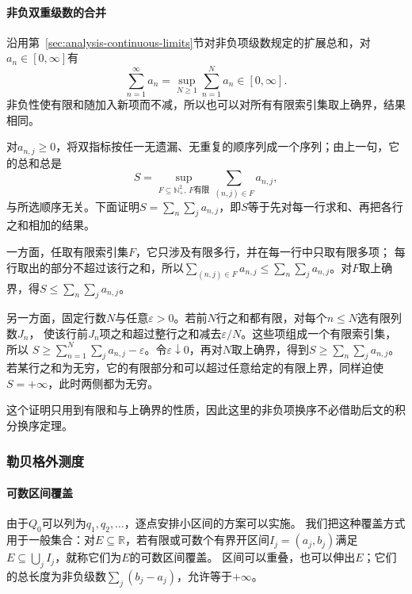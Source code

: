 \paragraph{非负双重级数的合并}

沿用第~\ref{sec:analysis-continuous-limits}节对非负项级数规定的扩展总和，对$a_n\in[0,\infty]$有
\begin{equation}
 \sum_{n=1}^{\infty}a_n
 =\sup_{N\geq1}\sum_{n=1}^Na_n\in[0,\infty].
 \label{eq:comb-nonnegative-sum-supremum}
\end{equation}
非负性使有限和随加入新项而不减，所以也可以对所有有限索引集取上确界，结果相同。

对$a_{n,j}\geq0$，将双指标按任一无遗漏、无重复的顺序列成一个序列；由上一句，它的总和总是
\[
 S=\sup_{F\subseteq\mathbb N_+^2,\,F\text{有限}}
          \sum_{(n,j)\in F}a_{n,j},
\]
与所选顺序无关。下面证明$S=\sum_n\sum_j a_{n,j}$，即$S$等于先对每一行求和、再把各行之和相加的结果。

一方面，任取有限索引集$F$，它只涉及有限多行，并在每一行中只取有限多项；
每行取出的部分不超过该行之和，所以$\sum_{(n,j)\in F}a_{n,j}\leq\sum_n\sum_ja_{n,j}$。对$F$取上确界，得$S\leq\sum_n\sum_ja_{n,j}$。

另一方面，固定行数$N$与任意$\varepsilon>0$。若前$N$行之和都有限，对每个$n\leq N$选有限列数$J_n$，
使该行前$J_n$项之和超过整行之和减去$\varepsilon/N$。这些项组成一个有限索引集，所以
$S\geq\sum_{n=1}^N\sum_ja_{n,j}-\varepsilon$。令$\varepsilon\downarrow0$，再对$N$取上确界，得到$S\geq\sum_n\sum_ja_{n,j}$。
若某行之和为无穷，它的有限部分和可以超过任意给定的有限上界，同样迫使$S=+\infty$，此时两侧都为无穷。

这个证明只用到有限和与上确界的性质，因此这里的非负项换序不必借助后文的积分换序定理。

\subsubsection{勒贝格外测度}
\label{sec:comb-length-and-lebesgue-measure}

\paragraph{可数区间覆盖}

由于$Q_0$可以列为$q_1,q_2,\ldots$，逐点安排小区间的方案可以实施。
我们把这种覆盖方式用于一般集合：对$E\subseteq\mathbb R$，若有限或可数个有界开区间$I_j=(a_j,b_j)$满足$E\subseteq\bigcup_j I_j$，就称它们为$E$的可数区间覆盖。
区间可以重叠，也可以伸出$E$；它们的总长度为非负级数$\sum_j(b_j-a_j)$，允许等于$+\infty$。

